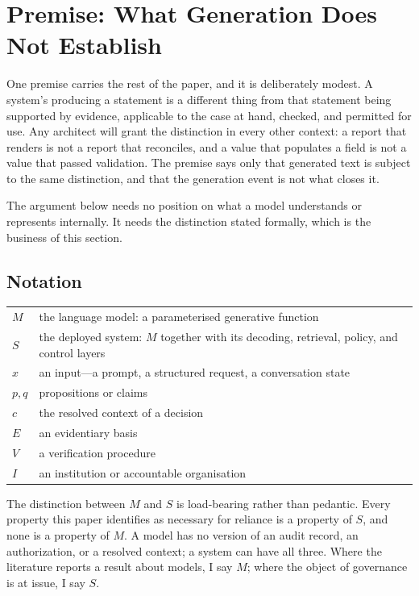 \documentclass[11pt]{article}
\theoremstyle{plain}
\theoremstyle{definition}
\begin{document}
\section{Premise: What Generation Does Not Establish}
\label{sec:premise}

One premise carries the rest of the paper, and it is deliberately modest. A
system's producing a statement is a different thing from that statement being
supported by evidence, applicable to the case at hand, checked, and permitted for
use. Any architect will grant the distinction in every other context: a report that
renders is not a report that reconciles, and a value that populates a field is not
a value that passed validation. The premise says only that generated text is
subject to the same distinction, and that the generation event is not what closes
it.

The argument below needs no position on what a model understands or represents
internally. It needs the distinction stated formally, which is the business of this
section.

\subsection{Notation}
\label{sec:notation}

\begin{center}
\begin{tabular}{@{}ll@{}}
\toprule
$M$ & the language model: a parameterised generative function \\
$S$ & the deployed system: $M$ together with its decoding, retrieval, policy,
      and control layers \\
$x$ & an input---a prompt, a structured request, a conversation state \\
$p, q$ & propositions or claims \\
$c$ & the resolved context of a decision \\
$E$ & an evidentiary basis \\
$V$ & a verification procedure \\
$I$ & an institution or accountable organisation \\
\bottomrule
\end{tabular}
\end{center}

The distinction between $M$ and $S$ is load-bearing rather than pedantic. Every
property this paper identifies as necessary for reliance is a property of $S$, and
none is a property of $M$. A model has no version of an audit record, an
authorization, or a resolved context; a system can have all three. Where the
literature reports a result about models, I say $M$; where the object of
governance is at issue, I say $S$.
\end{document}
